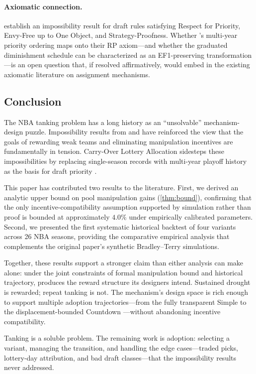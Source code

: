 \paragraph{Axiomatic connection.} \citet{coreno2022axiomatic} establish an impossibility result for draft rules satisfying Respect for Priority, Envy-Free up to One Object, and Strategy-Proofness. Whether \cola{}'s multi-year priority ordering maps onto their RP axiom---and whether the graduated diminishment schedule can be characterized as an EF1-preserving transformation---is an open question that, if resolved affirmatively, would embed \cola{} in the existing axiomatic literature on assignment mechanisms.

\subsection{Conclusion}
\label{sec:conclusion}

The NBA tanking problem has a long history as an ``unsolvable'' mechanism-design puzzle. Impossibility results from \citet{munro2020notanking} and \citet{coreno2022axiomatic} have reinforced the view that the goals of rewarding weak teams and eliminating manipulation incentives are fundamentally in tension. Carry-Over Lottery Allocation sidesteps these impossibilities by replacing single-season records with multi-year playoff history as the basis for draft priority \citep{highley2026cola}.

This paper has contributed two results to the \cola{} literature. First, we derived an analytic upper bound on pool manipulation gains (\cref{thm:bound}), confirming that the only incentive-compatibility assumption supported by simulation rather than proof is bounded at approximately $4.0\%$ under empirically calibrated parameters. Second, we presented the first systematic historical backtest of four \cola{} variants across 26 NBA seasons, providing the comparative empirical analysis that complements the original paper's synthetic Bradley--Terry simulations.

Together, these results support a stronger claim than either analysis can make alone: under the joint constraints of formal manipulation bound and historical trajectory, \cola{} produces the reward structure its designers intend. Sustained drought is rewarded; repeat tanking is not. The mechanism's design space is rich enough to support multiple adoption trajectories---from the fully transparent Simple \cola{} to the displacement-bounded Countdown \cola{}---without abandoning incentive compatibility.

Tanking is a soluble problem. The remaining work is adoption: selecting a variant, managing the transition, and handling the edge cases---traded picks, lottery-day attribution, and bad draft classes---that the impossibility results never addressed.

